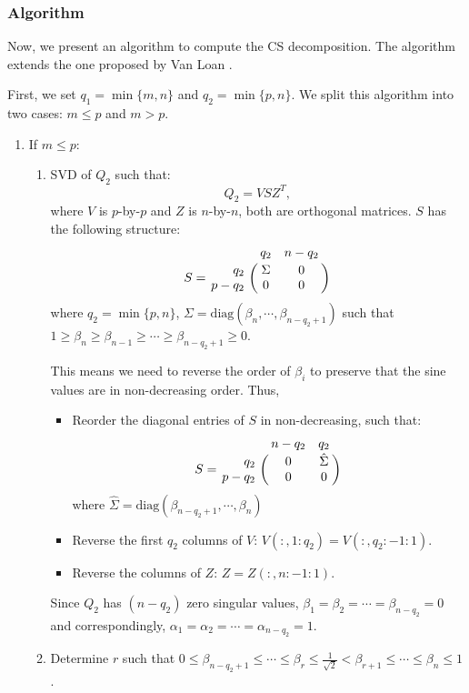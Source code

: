 \subsubsection{Algorithm} 
Now, we present an algorithm to compute the CS decomposition. 
The algorithm extends the one proposed by Van Loan \cite{vanloan85}.    
    
First, we set $q_1 = \min\{m, n\}$ and $q_2 = \min\{p, n\}$. 
We split this algorithm into two cases: $m \leq p$ and $m > p$.
    
\begin{enumerate}
\item If $m \leq p$:
\begin{enumerate}
\item SVD of $Q_2$ such that:
\begin{equation}
Q_2 = VSZ^{T}, 
\end{equation}
where $V$ is $p$-by-$p$ and $Z$ is $n$-by-$n$, 
both are orthogonal matrices. 
$S$ has the following structure:
\begin{displaymath}
S = \bordermatrix{ & q_2 & n-q_2 \cr
\hfill q_2 & \Sigma & 0 \cr
\hfill p-q_2 & 0 & 0}
\end{displaymath}
where $q_2 = \min\{p, n\}$, 
$\Sigma = \mbox{diag}(\beta_n, \cdots, \beta_{n-q_2+1})$ 
such that 
$1 \geq \beta_n \geq \beta_{n-1} \geq \cdots \geq \beta_{n-q_2+1} \geq 0$. 

This means we need to reverse the order of $\beta_{i}$ to preserve 
that the sine values are in non-decreasing order. Thus,
\begin{itemize}
\item Reorder the diagonal entries of $S$ in non-decreasing, such that:
\begin{displaymath}
S = \bordermatrix{ & n-q_2 & q_2 \cr
\hfill q_2 & 0 & \hat{\Sigma} \cr
\hfill p-q_2 & 0 & 0}
\end{displaymath} 
where $\hat{\Sigma} = \mbox{diag}(\beta_{n-q_2+1}, \cdots, \beta_{n})$
\item Reverse the first $q_2$ columns of $V$: $V(:,1:q_2) = V(:,q_2:-1:1)$. 
\item Reverse the columns of $Z$: $Z = Z(:,n:-1:1)$. 
\end{itemize}
                    
Since $Q_2$ has $(n-q_2)$ zero singular values, 
$\beta_{1} = \beta_{2} = \cdots = \beta_{n-q_2} = 0$ and 
correspondingly, $\alpha_1 = \alpha_2 = \cdots = \alpha_{n-q_2} = 1$.

\item Determine $r$ such that 
$0 \leq \beta_{n-q_2+1} \leq \cdots \leq \beta_{r} 
\leq \frac{1}{\sqrt{2}} < \beta_{r+1} 
\leq \cdots \leq \beta_{n} \leq 1$. 
                

\end{enumerate}
\end{enumerate}
